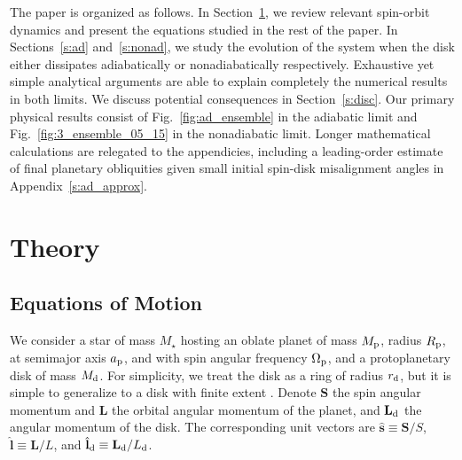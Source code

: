 \documentclass[
        fleqn,
        usenatbib,
    ]{mnras}
\newcommand*{\bm}[1]{\boldsymbol{\mathbf{#1}}}
\newcommand*{\uv}[1]{\hat{\bm{#1}}}
\begin{document}
The paper is organized as follows. In Section~\ref{s:eq}, we review relevant
spin-orbit dynamics and present the equations studied in the rest of the paper.
In Sections~\ref{s:ad} and~\ref{s:nonad}, we study the evolution of the system
when the disk either dissipates adiabatically or nonadiabatically respectively.
Exhaustive yet simple analytical arguments are able to explain completely the
numerical results in both limits. We discuss potential consequences in
Section~\ref{s:disc}. Our primary physical results consist of
Fig.~\ref{fig:ad_ensemble} in the adiabatic limit and
Fig.~\ref{fig:3_ensemble_05_15} in the nonadiabatic limit. Longer mathematical
calculations are relegated to the appendicies, including a leading-order
estimate of final planetary obliquities given small initial spin-disk
misalignment angles in Appendix~\ref{s:ad_approx}.

\section{Theory}\label{s:eq}

\subsection{Equations of Motion}

We consider a star of mass $M_\star$ hosting an oblate planet of mass $M_{\rm
p}$, radius $R_{\rm p}$, at semimajor axis $a_{\rm p}$, and with spin angular
frequency $\Omega_{\rm p}$, and a protoplanetary disk of mass $M_{\rm d}$. For
simplicity, we treat the disk as a ring of radius $r_{\rm d}$, but it is simple to
generalize to a disk with finite extent \citep[see][]{millholland_disk}.
Denote $\bm{S}$ the spin angular momentum and $\bm{L}$ the orbital angular
momentum of the planet, and $\bm{L}_{\rm d}$ the angular momentum of the disk.
The corresponding unit vectors are $\uv{s} \equiv \bm{S} / S$,
$\uv{l} \equiv \bm{L} / L$, and $\uv{l}_{\rm d} \equiv \bm{L}_{\rm
d} / L_{\rm d}$.
\end{document}
